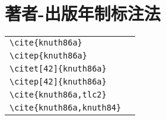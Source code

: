 \section{著者-出版年制标注法}

\noindent
\begin{tabular}{l@{\quad$\Rightarrow$\quad}l}
  \verb|\cite{knuth86a}|         & \cite{knuth86a}         \\
  \verb|\citep{knuth86a}|        & \citep{knuth86a}        \\
  \verb|\citet[42]{knuth86a}|    & \citet[42]{knuth86a}    \\
  \verb|\citep[42]{knuth86a}|    & \citep[42]{knuth86a}    \\
  \verb|\cite{knuth86a,tlc2}|    & \cite{knuth86a,tlc2}    \\
  \verb|\cite{knuth86a,knuth84}| & \cite{knuth86a,knuth84} \\
\end{tabular}


\nocite{*}
